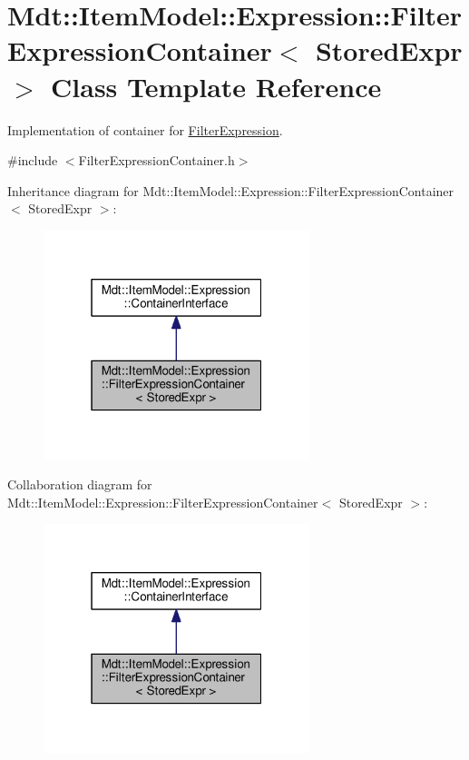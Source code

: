 \hypertarget{class_mdt_1_1_item_model_1_1_expression_1_1_filter_expression_container}{}\section{Mdt\+:\+:Item\+Model\+:\+:Expression\+:\+:Filter\+Expression\+Container$<$ Stored\+Expr $>$ Class Template Reference}
\label{class_mdt_1_1_item_model_1_1_expression_1_1_filter_expression_container}


Implementation of container for \hyperlink{class_mdt_1_1_item_model_1_1_filter_expression}{Filter\+Expression}.  




{\ttfamily \#include $<$Filter\+Expression\+Container.\+h$>$}



Inheritance diagram for Mdt\+:\+:Item\+Model\+:\+:Expression\+:\+:Filter\+Expression\+Container$<$ Stored\+Expr $>$\+:\nopagebreak
\begin{figure}[H]
\begin{center}
\leavevmode
\includegraphics[width=220pt]{class_mdt_1_1_item_model_1_1_expression_1_1_filter_expression_container__inherit__graph}
\end{center}
\end{figure}


Collaboration diagram for Mdt\+:\+:Item\+Model\+:\+:Expression\+:\+:Filter\+Expression\+Container$<$ Stored\+Expr $>$\+:\nopagebreak
\begin{figure}[H]
\begin{center}
\leavevmode
\includegraphics[width=220pt]{class_mdt_1_1_item_model_1_1_expression_1_1_filter_expression_container__coll__graph}
\end{center}
\end{figure}
